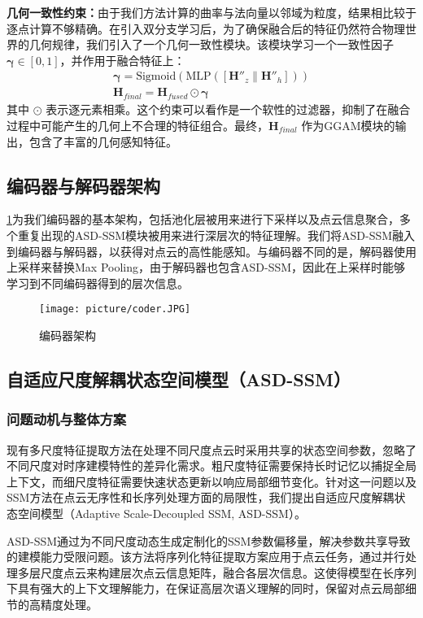 \documentclass[preprint,12pt]{elsarticle}
\begin{document}
\textbf{几何一致性约束：}由于我们方法计算的曲率与法向量以邻域为粒度，结果相比较于逐点计算不够精确。在引入双分支学习后，为了确保融合后的特征仍然符合物理世界的几何规律，我们引入了一个几何一致性模块。该模块学习一个一致性因子 $\boldsymbol{\gamma} \in [0, 1]$，并作用于融合特征上：
\begin{gather}
	\boldsymbol{\gamma} = \text{Sigmoid}(\text{MLP}([\mathbf{H}''_z \| \mathbf{H}''_h])) \label{eq:consistency_factor} \\
	\mathbf{H}_{final} = \mathbf{H}_{fused} \odot \boldsymbol{\gamma} \label{eq:final_feature}
\end{gather}
其中 $\odot$ 表示逐元素相乘。这个约束可以看作是一个软性的过滤器，抑制了在融合过程中可能产生的几何上不合理的特征组合。最终，$\mathbf{H}_{final}$ 作为GGAM模块的输出，包含了丰富的几何感知特征。

\subsection{编码器与解码器架构}
\cref{fig:coder}为我们编码器的基本架构，包括池化层被用来进行下采样以及点云信息聚合，多个重复出现的ASD-SSM模块被用来进行深层次的特征理解。我们将ASD-SSM融入到编码器与解码器，以获得对点云的高性能感知。与编码器不同的是，解码器使用上采样来替换Max Pooling，由于解码器也包含ASD-SSM，因此在上采样时能够学习到不同编码器得到的层次信息。

\begin{figure}[htbp]
	\centering
	\texttt{[image: picture/coder.JPG]}
	\caption{编码器架构}
	\label{fig:coder}
\end{figure}
\subsection{自适应尺度解耦状态空间模型（ASD-SSM）}

\subsubsection{问题动机与整体方案}

现有多尺度特征提取方法在处理不同尺度点云时采用共享的状态空间参数，忽略了不同尺度对时序建模特性的差异化需求。粗尺度特征需要保持长时记忆以捕捉全局上下文，而细尺度特征需要快速状态更新以响应局部细节变化。针对这一问题以及SSM方法在点云无序性和长序列处理方面的局限性，我们提出自适应尺度解耦状态空间模型（Adaptive Scale-Decoupled SSM, ASD-SSM）。

ASD-SSM通过为不同尺度动态生成定制化的SSM参数偏移量，解决参数共享导致的建模能力受限问题。该方法将序列化特征提取方案应用于点云任务，通过并行处理多层尺度点云来构建层次点云信息矩阵，融合各层次信息。这使得模型在长序列下具有强大的上下文理解能力，在保证高层次语义理解的同时，保留对点云局部细节的高精度处理。
\end{document}
